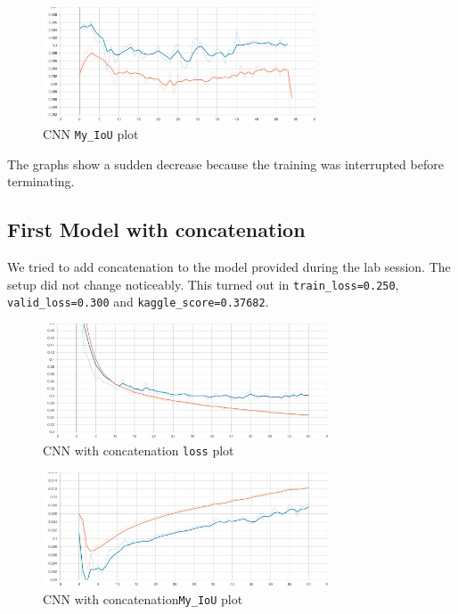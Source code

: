 \documentclass{article}
\begin{document}
		\begin{figure}[H]
			\centering
			\includegraphics[height=3.4cm, keepaspectratio]{First_Model_CNN_Dec04_19-24-31_epoch_my_IoU.jpg}
			\caption{CNN \texttt{My\_IoU} plot}
		\end{figure}
		
					
		The graphs show a sudden decrease because the training was interrupted before terminating.
		
		\subsection{First Model with concatenation}
			We tried to add concatenation to the model provided during the lab session. The setup did not change noticeably. This turned out in \texttt{train\_loss=0.250}, \texttt{valid\_loss=0.300} and \texttt{kaggle\_score=0.37682}.
			
			\begin{figure}[H]
				\centering
				\includegraphics[height=3.4cm, keepaspectratio]{First_Model_conv_CNN_Dec06_20-49-34_epoch_loss.jpg}
				\caption{CNN with concatenation \texttt{loss} plot}
			\end{figure}
	
			\begin{figure}[H]
				\centering
				\includegraphics[height=3.4cm, keepaspectratio]{First_Model_conv_CNN_Dec06_20-49-34_epoch_my_IoU.jpg}
				\caption{CNN with concatenation\texttt{My\_IoU} plot}
			\end{figure}
			
\end{document}
